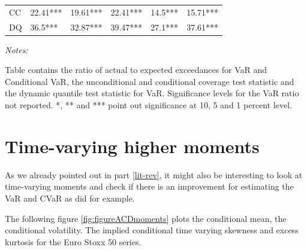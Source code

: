 \documentclass[a4paper, twoside]{templates/ociamthesis}
\begin{document}
\begin{table}
\begin{threeparttable}
\begin{tabular}[t]{llllll}
\hspace{1em}\hspace{1em}CC & 22.41*** & 19.61*** & 22.41*** & 14.5*** & 15.71***\\
\hspace{1em}\hspace{1em}DQ & 36.5*** & 32.87*** & 39.47*** & 27.1*** & 37.61***\\
\bottomrule
\end{tabular}
\begin{tablenotes}
\item \textit{Notes:} 
\item Table contains the ratio of actual to expected exceedances for VaR and Conditional VaR, the unconditional and conditional coverage test statistic and the dynamic quantile test statistic for VaR. Significance levels for the VaR ratio not reported. *, ** and *** point out significance at 10, 5 and 1 percent level.
\end{tablenotes}
\end{threeparttable}
\end{table}

\clearpage

\hypertarget{time-varying-higher-moments}{%
\section{Time-varying higher moments}\label{time-varying-higher-moments}}

As we already pointed out in part \ref{lit-rev}, it might also be interesting to look at time-varying moments and check if there is an improvement for estimating the VaR and CVaR as \textcite{bali2008} did for example.

The following figure \ref{fig:figureACDmoments} plots the conditional mean, the conditional volatility. The implied conditional time varying skewness and excess kurtosis for the Euro Stoxx 50 series.
\end{document}
